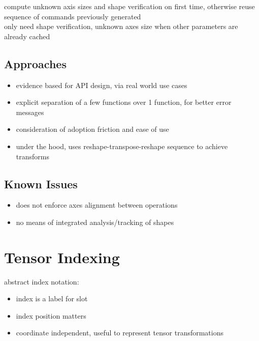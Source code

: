 \documentclass[8pt]{extarticle}
\begin{document}
\begin{multicols*}{2}
\begin{itemize}
    compute unknown axis sizes and shape verification on first time, otherwise reuse sequence of commands previously generated\\
    
    only need shape verification, unknown axes size when other parameters are already cached
  \end{itemize}

  \subsection{Approaches}
  
  \begin{itemize}
  \item evidence based for API design, via real world use cases
  \item explicit separation of a few functions over 1 function, for better error messages
  \item consideration of adoption friction and ease of use
  \item under the hood, uses reshape-transpose-reshape sequence to achieve transforms
  \end{itemize}

  \vfill\null
  \columnbreak
    
  \subsection{Known Issues}
  \begin{itemize}
  \item does not enforce axes alignment between operations
  \item no means of integrated analysis/tracking of shapes
  \end{itemize}
  
  \vfill\null
  \pagebreak

  \section{Tensor Indexing}

  abstract index notation:
  \begin{itemize}
  \item index is a label for slot
  \item index position matters
  \item coordinate independent, useful to represent tensor transformations
  \end{itemize}


\end{multicols*}
\end{document}
